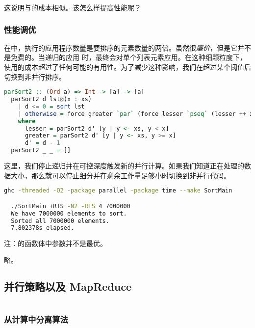 \documentclass[./main.tex]{subfiles}
\begin{document}
这说明与的成本相似。该怎么样提高性能呢？

\subsubsection*{性能调优}

在中，执行的应用程序数量是要排序的元素数量的两倍。虽然很\textit{廉价}，但是它并不是免费的。当递归的应用
时，最终会对单个列表元素应用。在这种细颗粒度下，使用的成本超过了任何可能的有用性。为了减少这种影响，我们在超过某个阈值后切换到非并行排序。

\begin{lstlisting}[language=Haskell]
  parSort2 :: (Ord a) => Int -> [a] -> [a]
  parSort2 d lst@(x : xs)
    | d <= 0 = sort lst
    | otherwise = force greater `par` (force lesser `pseq` (lesser ++ x : greater))
    where
      lesser = parSort2 d' [y | y <- xs, y < x]
      greater = parSort2 d' [y | y <- xs, y >= x]
      d' = d - 1
  parSort2 _ _ = []
\end{lstlisting}

这里，我们停止递归并在可控深度触发新的并行计算。如果我们知道正在处理的数据大小，那么就可以停止细分并在剩余工作量足够小时切换到非并行代码。

\begin{lstlisting}[language=Bash]
  ghc -threaded -O2 -package parallel -package time --make SortMain

  ./SortMain +RTS -N2 -RTS 4 7000000
  We have 7000000 elements to sort.
  Sorted all 7000000 elements.
  7.802378s elapsed.
\end{lstlisting}

注：的函数体中参数并不是最优。

略。

\subsection*{并行策略以及 MapReduce}

%

\begin{lstlisting}[language=Haskell]

\end{lstlisting}

\subsubsection*{从计算中分离算法}
\end{document}
